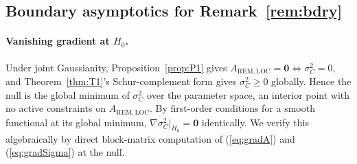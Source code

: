 \documentclass[11pt,letterpaper]{article}
\theoremstyle{remark}
\newcommand{\REM}{\mathrm{REM}}
\newcommand{\LOC}{\mathrm{LOC}}
\newcommand{\sigC}{\sigma^2_C}
\begin{document}
\subsection{Boundary asymptotics for Remark~\ref{rem:bdry}}\label{app:G-bdry}

\paragraph{Vanishing gradient at $H_0$.} Under joint Gaussianity, Proposition~\ref{prop:P1} gives $A_{\REM, \LOC} = \mathbf{0} \iff \sigC = 0$, and Theorem~\ref{thm:T1}'s Schur-complement form gives $\sigC \ge 0$ globally. Hence the null is the global minimum of $\sigC$ over the parameter space, an interior point with no active constraints on $A_{\REM, \LOC}$. By first-order conditions for a smooth functional at its global minimum, $\nabla \sigC|_{H_0} = \mathbf{0}$ identically. We verify this algebraically by direct block-matrix computation of (\ref{eq:gradA}) and (\ref{eq:gradSigma}) at the null.
\end{document}
